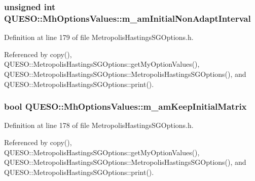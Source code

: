 \hypertarget{class_q_u_e_s_o_1_1_mh_options_values_a3e72af53780ce9420c3454b00f56bc11}{
\subsubsection[{m\-\_\-am\-Initial\-Non\-Adapt\-Interval}]{\setlength{\rightskip}{0pt plus 5cm}unsigned int Q\-U\-E\-S\-O\-::\-Mh\-Options\-Values\-::m\-\_\-am\-Initial\-Non\-Adapt\-Interval}}\label{class_q_u_e_s_o_1_1_mh_options_values_a3e72af53780ce9420c3454b00f56bc11}


Definition at line 179 of file Metropolis\-Hastings\-S\-G\-Options.\-h.



Referenced by copy(), Q\-U\-E\-S\-O\-::\-Metropolis\-Hastings\-S\-G\-Options\-::get\-My\-Option\-Values(), Q\-U\-E\-S\-O\-::\-Metropolis\-Hastings\-S\-G\-Options\-::\-Metropolis\-Hastings\-S\-G\-Options(), and Q\-U\-E\-S\-O\-::\-Metropolis\-Hastings\-S\-G\-Options\-::print().

\hypertarget{class_q_u_e_s_o_1_1_mh_options_values_a65b54138ec13a04d67a75a03f6300132}{
\subsubsection[{m\-\_\-am\-Keep\-Initial\-Matrix}]{\setlength{\rightskip}{0pt plus 5cm}bool Q\-U\-E\-S\-O\-::\-Mh\-Options\-Values\-::m\-\_\-am\-Keep\-Initial\-Matrix}}\label{class_q_u_e_s_o_1_1_mh_options_values_a65b54138ec13a04d67a75a03f6300132}


Definition at line 178 of file Metropolis\-Hastings\-S\-G\-Options.\-h.



Referenced by copy(), Q\-U\-E\-S\-O\-::\-Metropolis\-Hastings\-S\-G\-Options\-::get\-My\-Option\-Values(), Q\-U\-E\-S\-O\-::\-Metropolis\-Hastings\-S\-G\-Options\-::\-Metropolis\-Hastings\-S\-G\-Options(), and Q\-U\-E\-S\-O\-::\-Metropolis\-Hastings\-S\-G\-Options\-::print().

